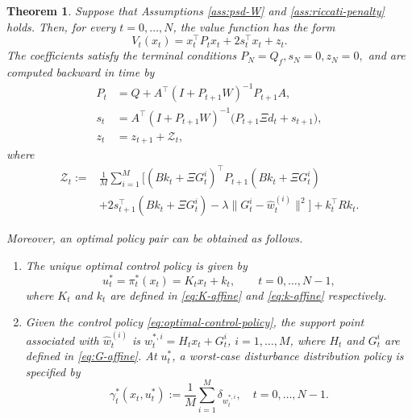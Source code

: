 \documentclass[10pt,journal,twoside]{IEEEtran}
\newtheorem{theorem}{Theorem}
\theoremstyle{definition}
\theoremstyle{remark}
\begin{document}
\begin{theorem}
	\label{thm:affine-bellman-reduction}
	Suppose that Assumptions \ref{ass:psd-W} and \ref{ass:riccati-penalty} holds.
	Then, for every \(t=0,\ldots,N\), the value function has the form
	\begin{equation}
		V_t(x_t)
		=
		x_t^\top P_tx_t+2s_t^\top x_t+z_t .
		\label{eq:affine-value}
	\end{equation}
	The coefficients satisfy the terminal conditions \(P_N=Q_f, s_N=0, z_N=0,\)
	and are computed backward in time by
	\begin{align}
		P_t&=Q+A^\top(I+P_{t+1}W)^{-1}P_{t+1}A,
		\label{eq:P-recursion-affine}\\
		s_t&=A^\top(I+P_{t+1}W)^{-1}\big(P_{t+1}\Xi d_t+s_{t+1}\big),
        \label{eq:s-recursion-affine}\\
		z_t&=z_{t+1}+\mathcal Z_t,
		\label{eq:z-recursion-affine}
	\end{align}
	where
	\begin{equation}
		\begin{aligned}
			\mathcal Z_t
			:={}&
			\frac1M\sum_{i=1}^M
			\Big[
			(Bk_t+\Xi G_t^i)^\top
			P_{t+1}
			(Bk_t+\Xi G_t^i)\\
			&
			+2s_{t+1}^\top(Bk_t+\Xi G_t^i)
			-\lambda\|G_t^i-\widehat w_t^{(i)}\|^2
			\Big]+k_t^\top Rk_t.
		\end{aligned}
		\label{eq:Z-increment}
	\end{equation}
	
	Moreover, an optimal policy pair can be obtained as follows.
	\begin{enumerate}
		\item The unique optimal control policy is given by
		\begin{equation}
			u_t^*=\pi_t^*(x_t)=K_tx_t+k_t,
			\qquad t=0,\ldots,N-1,
			\label{eq:optimal-control-policy}
		\end{equation}
		where \(K_t\) and \(k_t\) are defined in
		\eqref{eq:K-affine} and \eqref{eq:k-affine} respectively.
		
		\item Given the control policy \eqref{eq:optimal-control-policy}, the support point associated with \(\widehat w_t^{(i)}\) is $w_t^{*,i}=H_t x_t+G_t^i$, $i=1,\ldots,M$,
		where \(H_t\) and \(G_t^i\) are defined in  \eqref{eq:G-affine}. At $u_t^*$, a worst-case disturbance
		distribution policy is specified by
		\begin{equation*}
			\gamma_t^*(x_t,u_t^*)
			:=
			\frac1M\sum_{i=1}^M
			\delta_{w_t^{*,i}},
			\quad t=0,\ldots,N-1.
		\end{equation*}
	\end{enumerate}
\end{theorem}
\end{document}
